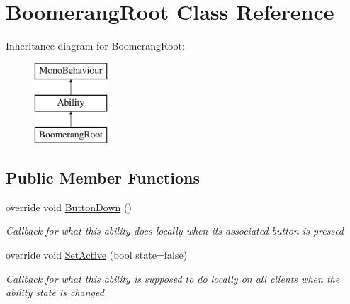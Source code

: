 \hypertarget{class_boomerang_root}{}\section{Boomerang\+Root Class Reference}
\label{class_boomerang_root}
Inheritance diagram for Boomerang\+Root\+:\begin{figure}[H]
\begin{center}
\leavevmode
\includegraphics[height=3.000000cm]{class_boomerang_root}
\end{center}
\end{figure}
\subsection*{Public Member Functions}
\begin{DoxyCompactItemize}
\item 
override void \hyperlink{class_boomerang_root_a24efe6d7fc4691ad985c05c649a8b7d8}{Button\+Down} ()
\begin{DoxyCompactList}\small\item\em Callback for what this ability does locally when its associated button is pressed \end{DoxyCompactList}\item 
override void \hyperlink{class_boomerang_root_ada0fc97c2ae52051df846fe6434f33aa}{Set\+Active} (bool state=false)
\begin{DoxyCompactList}\small\item\em Callback for what this ability is supposed to do locally on all clients when the ability state is changed \end{DoxyCompactList}\end{DoxyCompactItemize}
